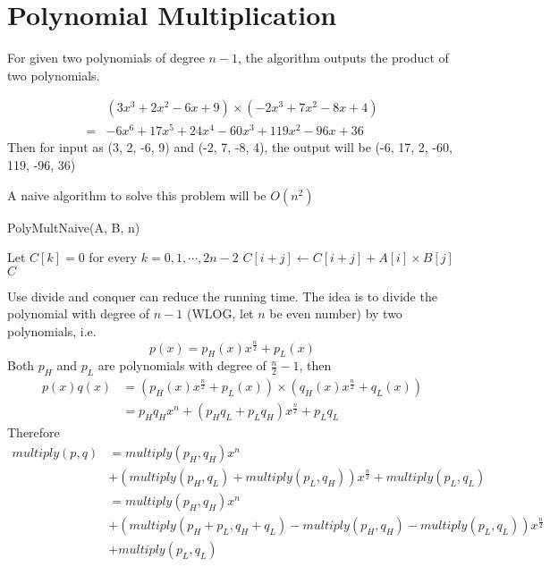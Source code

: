 			\section{Polynomial Multiplication}
				For given two polynomials of degree $n - 1$, the algorithm outputs the product of two polynomials.
				\begin{example}
					\begin{align}
						&(3x^3 + 2x^2 - 6x + 9) \times (-2x^3 + 7x^2 - 8x + 4)\\
						=& -6x^6 + 17x^5 + 24x^4 -60x^3 +119x^2 -96x +36
					\end{align}
					Then for input as (3, 2, -6, 9) and (-2, 7, -8, 4), the output will be (-6, 17, 2, -60, 119, -96, 36)
				\end{example}

				A naive algorithm to solve this problem will be $O(n^2)$
				\begin{algorithm}[h]
					\caption{PolyMultNaive(A, B, n)}
					\begin{algorithmic}[1]
						\State Let $C[k] = 0$ for every $k = 0, 1, \cdots, 2n - 2$
								\State $C[i + j] \gets C[i + j] + A[i] \times B[j]$
							\EndFor
						\EndFor
						\Return $C$
					\end{algorithmic}
				\end{algorithm}

				Use divide and conquer can reduce the running time. The idea is to divide the polynomial with degree of $n - 1$ (WLOG, let $n$ be even number) by two polynomials, i.e.
				\begin{equation}
					p(x) = p_H(x)x^{\frac{n}{2}} + p_L(x)
				\end{equation}
				Both $p_H$ and $p_L$ are polynomials with degree of $\frac{n}{2} - 1$, then
				\begin{align}
					p(x)q(x) &= (p_H(x)x^{\frac{n}{2}} + p_L(x)) \times (q_H(x)x^{\frac{n}{2}} + q_L(x))\\
							 &= p_Hq_H x^n + (p_Hq_L + p_Lq_H) x^{\frac{n}{2}} + p_Lq_L
				\end{align}
				Therefore
				\begin{align}
					multiply(p, q) &= multiply(p_H, q_H) x^n\\
								   &+ (multiply(p_H, q_L) + multiply(p_L, q_H)) x^{\frac{n}{2}} + multiply(p_L, q_L)\\
								   &= multiply(p_H, q_H) x^n\\
								   &+ (multiply(p_H + p_L, q_H + q_L) - multiply(p_H, q_H) - multiply(p_L, q_L)) x^{\frac{n}{2}} \\
								   &+ multiply(p_L, q_L)\\
				\end{align}

